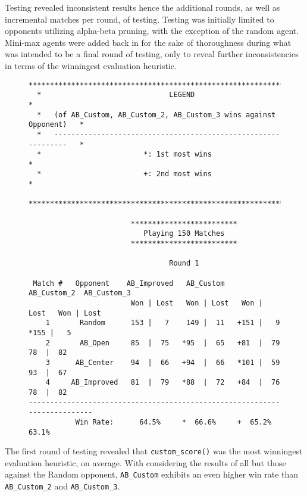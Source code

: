 \documentclass[12pt]{article}
\newcommand{\code}[2][python]{\texttt{#2}}
\begin{document}
Testing revealed inconsistent results hence the additional rounds, as well as
incremental matches per round, of testing. Testing was initially limited to
opponents utilizing alpha-beta pruning, with the exception of the random agent.
Mini-max agents were added back in for the sake of thoroughness during what was
intended to be a final round of testing, only to reveal further inconsistencies
in terms of the winningest evaluation heuristic.
\begin{figure}[H]
\begin{Verbatim}[fontsize=\footnotesize]
  **********************************************************************
  *                              LEGEND                                *
  *   (of AB_Custom, AB_Custom_2, AB_Custom_3 wins against Opponent)   *
  *   --------------------------------------------------------------   *
  *                        *: 1st most wins                            *
  *                        +: 2nd most wins                            *
  **********************************************************************

                        *************************                         
                           Playing 150 Matches                              
                        *************************                         
 
                                 Round 1 

 Match #   Opponent    AB_Improved   AB_Custom   AB_Custom_2  AB_Custom_3 
                        Won | Lost   Won | Lost   Won | Lost   Won | Lost 
    1       Random      153 |   7    149 |  11   +151 |   9   *155 |   5  
    2       AB_Open     85  |  75   *95  |  65   +81  |  79    78  |  82  
    3      AB_Center    94  |  66   +94  |  66   *101 |  59    93  |  67  
    4     AB_Improved   81  |  79   *88  |  72   +84  |  76    78  |  82  
--------------------------------------------------------------------------
           Win Rate:      64.5%     *  66.6%     +  65.2%        63.1%    
\end{Verbatim}
\end{figure}

The first round of testing revealed that \code{custom_score()} was the most
winningest evaluation heuristic, on average. With considering the results of
all but those against the Random opponent, \code{AB_Custom} exhibits an even
higher win rate than \code{AB_Custom_2} and \code{AB_Custom_3}.
\end{document}
